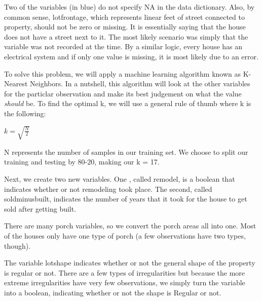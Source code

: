 \documentclass[12pt]{article}
\begin{document}
\begin{flushleft}
Two of the variables (in blue) do not specify NA in the data dictionary. Also, by common sense, lotfrontage, which represents linear feet of street connected to property, should not be zero or missing. It is essentially saying that the house does not have a street next to it. The most likely scenario was simply that the variable was not recorded at the time. By a similar logic, every house has an electrical system and if only one value is missing, it is most likely due to an error. \newline

To solve this problem, we will apply a machine learning algorithm known as K-Nearest Neighbors. In a nutshell, this algorithm will look at the other variables for the particlar observation and make its best judgement on what the value \textit{should} be. To find the optimal k, we will use a general rule of thumb where k is the following:

$k = \sqrt{\frac{N}{2}}$ 

N represents the number of samples in our training set. We choose to split our training and testing by 80-20, making our k = 17. 

Next, we create two new variables. One , called remodel, is a boolean that indicates whether or not remodeling took place. The second, called soldminusbuilt, indicates the number of years that it took for the house to get sold after getting built. 

There are many porch variables, so we convert the porch areas all into one. Most of the houses only have one type of porch (a few observations have two types, though). 

The variable lotshape indicates whether or not the general shape of the property is regular or not. There are a few types of irregularities but because the more extreme irregularities have very few observations, we simply turn the variable into a boolean, indicating whether or not the shape is Regular or not.


\end{flushleft}
\end{document}
